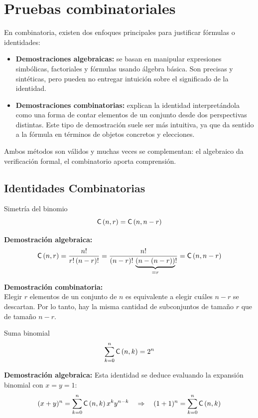 \section{Pruebas combinatoriales}

En combinatoria, existen dos enfoques principales para justificar fórmulas o identidades:

\begin{itemize}
    \item \textbf{Demostraciones algebraicas:} se basan en manipular expresiones simbólicas, factoriales y fórmulas usando álgebra básica. Son precisas y sintéticas, pero pueden no entregar intuición sobre el significado de la identidad.
    \item \textbf{Demostraciones combinatorias:} explican la identidad interpretándola como una forma de contar elementos de un conjunto desde dos perspectivas distintas. Este tipo de demostración suele ser más intuitiva, ya que da sentido a la fórmula en términos de objetos concretos y elecciones.
\end{itemize}

Ambos métodos son válidos y muchas veces se complementan: el algebraico da verificación formal, el combinatorio aporta comprensión.


\subsection*{Identidades Combinatorias}

\begin{thmblock}{Simetría del binomio}
\[
\mathsf{C}\left(n,r\right) = \mathsf{C}\left(n,n-r\right)
\]
\end{thmblock}
\noindent \textbf{Demostración algebraica:} \\[0.5em]
\[
\mathsf{C}\left(n,r\right) = \frac{n!}{r! \, (n-r)!} = \frac{n!}{(n-r)! \, \underbrace{(n-(n-r))}_{=r}!} = \mathsf{C}\left(n,n-r\right)
\]

\noindent \textbf{Demostración combinatoria:} \\[0.5em]
Elegir $r$ elementos de un conjunto de $n$ es equivalente a elegir cuáles $n-r$ se descartan. Por lo tanto, hay la misma cantidad de subconjuntos de tamaño $r$ que de tamaño $n - r$.

\begin{thmblock}{Suma binomial}
\[
\sum_{k=0}^n \mathsf{C}\left(n,k\right) = 2^n
\]
\end{thmblock}
\noindent \textbf{Demostración algebraica:} Esta identidad se deduce evaluando la expansión binomial con $x = y = 1$:
\[
(x + y)^n = \sum_{k=0}^n \mathsf{C}\left(n,k\right) x^k y^{n-k} \quad \Rightarrow \quad (1 + 1)^n = \sum_{k=0}^n \mathsf{C}\left(n,k\right)
\]


